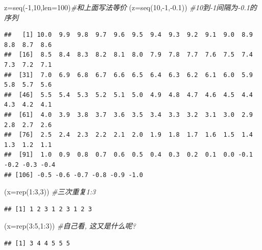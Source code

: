 \documentclass[
]{book}
\newenvironment{Shaded}{\begin{snugshade}}{\end{snugshade}}
\newcommand{\AttributeTok}[1]{\textcolor[rgb]{0.77,0.63,0.00}{#1}}
\newcommand{\CommentTok}[1]{\textcolor[rgb]{0.56,0.35,0.01}{\textit{#1}}}
\newcommand{\DecValTok}[1]{\textcolor[rgb]{0.00,0.00,0.81}{#1}}
\newcommand{\FloatTok}[1]{\textcolor[rgb]{0.00,0.00,0.81}{#1}}
\newcommand{\FunctionTok}[1]{\textcolor[rgb]{0.00,0.00,0.00}{#1}}
\newcommand{\NormalTok}[1]{#1}
\newcommand{\OtherTok}[1]{\textcolor[rgb]{0.56,0.35,0.01}{#1}}
\newcommand{\SpecialCharTok}[1]{\textcolor[rgb]{0.00,0.00,0.00}{#1}}
\begin{document}
\begin{Shaded}
\begin{Highlighting}[]
\NormalTok{z}\OtherTok{=}\FunctionTok{seq}\NormalTok{(}\SpecialCharTok{{-}}\DecValTok{1}\NormalTok{,}\DecValTok{10}\NormalTok{,}\AttributeTok{len=}\DecValTok{100}\NormalTok{)}\CommentTok{\#和上面写法等价}
\NormalTok{(}\AttributeTok{z=}\FunctionTok{seq}\NormalTok{(}\DecValTok{10}\NormalTok{,}\SpecialCharTok{{-}}\DecValTok{1}\NormalTok{,}\SpecialCharTok{{-}}\FloatTok{0.1}\NormalTok{)) }\CommentTok{\#10到{-}1间隔为{-}0.1的序列}
\end{Highlighting}
\end{Shaded}

\begin{verbatim}
##   [1] 10.0  9.9  9.8  9.7  9.6  9.5  9.4  9.3  9.2  9.1  9.0  8.9  8.8  8.7  8.6
##  [16]  8.5  8.4  8.3  8.2  8.1  8.0  7.9  7.8  7.7  7.6  7.5  7.4  7.3  7.2  7.1
##  [31]  7.0  6.9  6.8  6.7  6.6  6.5  6.4  6.3  6.2  6.1  6.0  5.9  5.8  5.7  5.6
##  [46]  5.5  5.4  5.3  5.2  5.1  5.0  4.9  4.8  4.7  4.6  4.5  4.4  4.3  4.2  4.1
##  [61]  4.0  3.9  3.8  3.7  3.6  3.5  3.4  3.3  3.2  3.1  3.0  2.9  2.8  2.7  2.6
##  [76]  2.5  2.4  2.3  2.2  2.1  2.0  1.9  1.8  1.7  1.6  1.5  1.4  1.3  1.2  1.1
##  [91]  1.0  0.9  0.8  0.7  0.6  0.5  0.4  0.3  0.2  0.1  0.0 -0.1 -0.2 -0.3 -0.4
## [106] -0.5 -0.6 -0.7 -0.8 -0.9 -1.0
\end{verbatim}

\begin{Shaded}
\begin{Highlighting}[]
\NormalTok{(}\AttributeTok{x=}\FunctionTok{rep}\NormalTok{(}\DecValTok{1}\SpecialCharTok{:}\DecValTok{3}\NormalTok{,}\DecValTok{3}\NormalTok{))  }\CommentTok{\#三次重复1:3}
\end{Highlighting}
\end{Shaded}

\begin{verbatim}
## [1] 1 2 3 1 2 3 1 2 3
\end{verbatim}

\begin{Shaded}
\begin{Highlighting}[]
\NormalTok{(}\AttributeTok{x=}\FunctionTok{rep}\NormalTok{(}\DecValTok{3}\SpecialCharTok{:}\DecValTok{5}\NormalTok{,}\DecValTok{1}\SpecialCharTok{:}\DecValTok{3}\NormalTok{)) }\CommentTok{\#自己看, 这又是什么呢?}
\end{Highlighting}
\end{Shaded}

\begin{verbatim}
## [1] 3 4 4 5 5 5
\end{verbatim}
\end{document}
